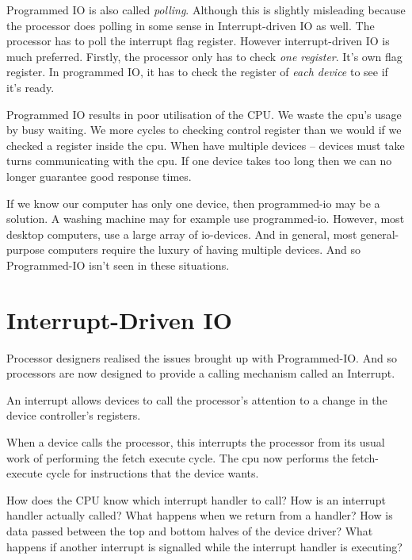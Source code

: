 Programmed IO is also called \textit{polling}. Although this is slightly misleading because 
the processor does polling in some sense in Interrupt-driven IO as well. The processor 
has to poll the interrupt flag register. However interrupt-driven IO is much preferred.
Firstly, the processor only has to check \textit{one register}. 
It's own flag register. In programmed IO, it has to check the register 
of \textit{each device} to see if it's ready. 

Programmed IO results in poor utilisation of the CPU. 
We waste the cpu’s usage by busy waiting. We more cycles to checking control register than 
we would if we checked a register inside the cpu. 
When have multiple devices – devices must take turns communicating with the cpu. 
If one device takes too long then we can no longer guarantee good response times.

If we know our computer has only one device, then programmed-io may be a solution. A washing machine may for example use programmed-io. However, most desktop computers, use a large array of io-devices. And in general, most general-purpose computers require the luxury of having multiple devices. And so Programmed-IO isn’t seen in these situations. 


\section{Interrupt-Driven IO}

Processor designers realised the issues brought up with Programmed-IO.
And so processors are now designed to provide a calling mechanism called an Interrupt.



An interrupt allows devices to call the processor’s attention to a 
change in the device controller’s registers.

When a device calls the processor, this interrupts the processor 
from its usual work of performing the fetch execute cycle. 
The cpu now performs the fetch-execute cycle for instructions that the device wants. 

How does the CPU know which interrupt handler to call?
How is an interrupt handler actually called?
What happens when we return from a handler?
How is data passed between the top and bottom halves of the device driver?
What happens if another interrupt is signalled while the interrupt handler is executing?




